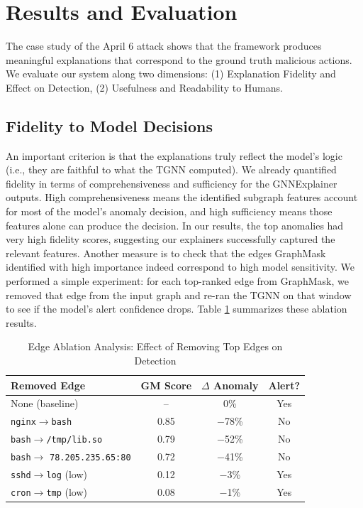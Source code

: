\documentclass[conference]{IEEEtran}
\begin{document}
\section{Results and Evaluation}

The case study of the April 6 attack shows that the framework produces meaningful explanations that correspond to the ground truth malicious actions. We evaluate our system along two dimensions: (1) Explanation Fidelity and Effect on Detection, (2) Usefulness and Readability to Humans.

\subsection{Fidelity to Model Decisions}
An important criterion is that the explanations truly reflect the model's logic (i.e., they are faithful to what the TGNN computed). We already quantified fidelity in terms of comprehensiveness and sufficiency for the GNNExplainer outputs. High comprehensiveness means the identified subgraph features account for most of the model's anomaly decision, and high sufficiency means those features alone can produce the decision. In our results, the top anomalies had very high fidelity scores, suggesting our explainers successfully captured the relevant features. Another measure is to check that the edges GraphMask identified with high importance indeed correspond to high model sensitivity. We performed a simple experiment: for each top-ranked edge from GraphMask, we removed that edge from the input graph and re-ran the TGNN on that window to see if the model's alert confidence drops. Table \ref{tab:ablation} summarizes these ablation results.

\begin{table}[htbp]
\caption{Edge Ablation Analysis: Effect of Removing Top Edges on Detection}
\begin{center}
\small
\begin{tabular}{|p{3.2cm}|c|c|c|}
\hline
\textbf{Removed Edge} & \textbf{GM Score} & \textbf{$\Delta$ Anomaly} & \textbf{Alert?} \\
\hline
None (baseline) & -- & 0\% & Yes \\
\hline
\texttt{nginx}$\rightarrow$\texttt{bash} & 0.85 & $-$78\% & No \\
\hline
\texttt{bash}$\rightarrow$\texttt{/tmp/lib.so} & 0.79 & $-$52\% & No \\
\hline
\texttt{bash}$\rightarrow$ \texttt{78.205.235.65:80} & 0.72 & $-$41\% & No \\
\hline
\texttt{sshd}$\rightarrow$\texttt{log} (low) & 0.12 & $-$3\% & Yes \\
\hline
\texttt{cron}$\rightarrow$\texttt{tmp} (low) & 0.08 & $-$1\% & Yes \\
\hline
\end{tabular}
\label{tab:ablation}
\end{center}
\end{table}
\end{document}
